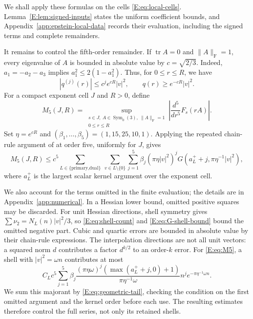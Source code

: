 \documentclass[reqno,english]{amsart}
\theoremstyle{definition}
\newtheorem{open problem}[theorem]{Open Problem}
\theoremstyle{remark}
\theoremstyle{plain}
\numberwithin{equation}{section}
\newcommand{\tr}{\operatorname{tr}}
\newcommand{\norm}[1]{\lVert#1\rVert_{\mathrm F}}
\newcommand{\Symzero}{\operatorname{Sym}_0(3)}
\begin{document}
We shall apply these formulas on the cells
\eqref{E:eq:local-cells}. Lemma~\ref{E:lem:signed-inputs} states
the uniform coefficient bounds, and
Appendix~\ref{app:epstein-local-data} records their evaluation,
including the signed terms and complete remainders.

It remains to control the fifth-order remainder. If $\tr A=0$ and
$\norm A=1$, every eigenvalue of $A$ is bounded in absolute value
by $c=\sqrt{2/3}$. Indeed, $a_1=-a_2-a_3$ implies
$a_1^2\le2(1-a_1^2)$. Thus, for $0\le r\le R$, we have
\[
 |q^{(j)}(r)|\le c^je^{cR}|v|^2,\qquad q(r)\ge e^{-cR}|v|^2.
\]
For a compact exponent cell $J$ and $R>0$, define
\[
 M_5(J,R)=\sup_{\substack{s\in J,\ A\in\Symzero,\ \norm A=1\\0\le r\le R}}
 \left|\frac{d^5}{dr^5}F_s(rA)\right|.
\]
Set $\eta=e^{cR}$ and
$(\beta_1,\ldots,\beta_5)=(1,15,25,10,1)$.
Applying the repeated chain-rule argument of
\cite[(34)--(36)]{SS} at order five, uniformly for $J$, gives
\begin{equation}
 M_5(J,R)\le c^5\sum_{L\in\{\text{primary,dual}\}}\ \sum_{v\in L\setminus\{0\}}
 \sum_{j=1}^5\beta_j(\pi\eta|v|^2)^j
 G(a_L^++j,\pi\eta^{-1}|v|^2),
 \label{E:eq:M5}
\end{equation}
where $a_L^+$ is the largest scalar kernel argument over the exponent cell.

We also account for the terms omitted in the finite evaluation;
the details are in Appendix~\ref{app:numerical}. In a Hessian
lower bound, omitted positive squares may be discarded. For unit
Hessian directions, shell symmetry gives
$\sum\nu_2=N_L(n)|v|^2/3$, so \eqref{E:eq:shell-count} and
\eqref{E:eq:G-shell-bound} bound the omitted negative part.
Cubic and quartic errors are bounded in absolute value by their
chain-rule expressions. The interpolation directions are not all
unit vectors: a squared norm $d$ contributes a factor $d^{k/2}$
to an order-$k$ error. For \eqref{E:eq:M5}, a shell with
$|v|^2=\omega n$ contributes at most
\[
 C_Lc^5\sum_{j=1}^5\beta_j
 \frac{(\pi\eta\omega)^j(\max(a_L^++j,0)+1)}{\pi\eta^{-1}\omega}
 n^je^{-\pi\eta^{-1}\omega n}.
\]
We sum this majorant by \eqref{E:eq:geometric-tail}, checking the
condition on the first omitted argument and the kernel order before
each use. The resulting estimates therefore control the full series,
not only its retained shells.
\end{document}
